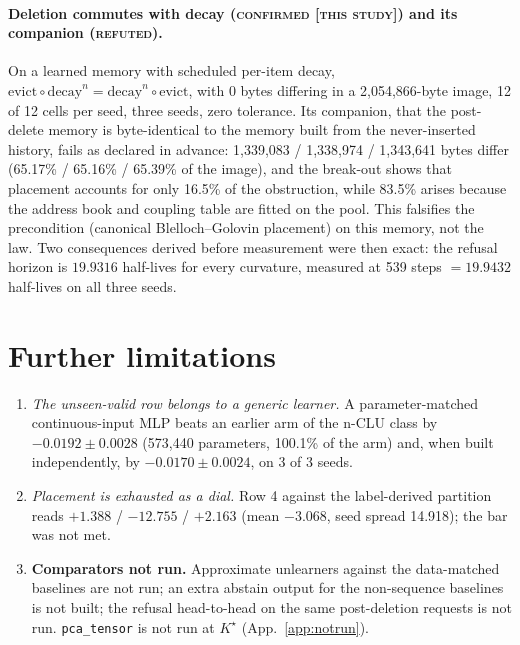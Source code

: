 \documentclass{article} %
\newcommand{\Kstar}{\ensuremath{K^{\star}}}
\begin{document}
\paragraph{Deletion commutes with decay (\textsc{confirmed [this study]}) and its companion
(\textsc{refuted}).} On a learned memory with scheduled per-item decay,
$\text{evict}\circ\text{decay}^n=\text{decay}^n\circ\text{evict}$, with 0 bytes differing in a
2,054,866-byte image, 12 of 12 cells per seed, three seeds, zero tolerance.
Its companion, that the post-delete memory is byte-identical to the memory built from the
never-inserted history, fails as declared in advance: 1,339,083 / 1,338,974 / 1,343,641 bytes differ
(65.17\% / 65.16\% / 65.39\% of the image), and the break-out shows that placement accounts for
only 16.5\% of the obstruction, while 83.5\% arises because the address book and coupling table
are fitted on the pool. %
This falsifies the precondition (canonical Blelloch--Golovin placement) on this memory, not the
law. Two consequences derived before measurement were then exact: the refusal horizon is $19.9316$
half-lives for every curvature, measured at 539 steps $=19.9432$ half-lives on all three seeds.


\section{Further limitations}
\label{app:morelimits}
\begin{enumerate}
\item \emph{The unseen-valid row belongs to a generic learner.} A parameter-matched
  continuous-input MLP beats an earlier arm of the n-CLU class by $-0.0192\pm0.0028$ (573,440
  parameters, 100.1\% of the arm) and, when built independently, by $-0.0170\pm0.0024$, on 3 of 3
  seeds. %
\item \emph{Placement is exhausted as a dial.} Row 4 against the label-derived partition reads
  $+1.388$ / $-12.755$ / $+2.163$ (mean $-3.068$, seed spread 14.918); the bar was not met.
\item \textbf{Comparators not run.} Approximate unlearners against the data-matched baselines are not
  run; an extra abstain output for the non-sequence baselines is not built; the refusal head-to-head on
  the same post-deletion requests is not run. \texttt{pca\_tensor} is not run at $\Kstar$
  (App.~\ref{app:notrun}).
\end{enumerate}
\end{document}
